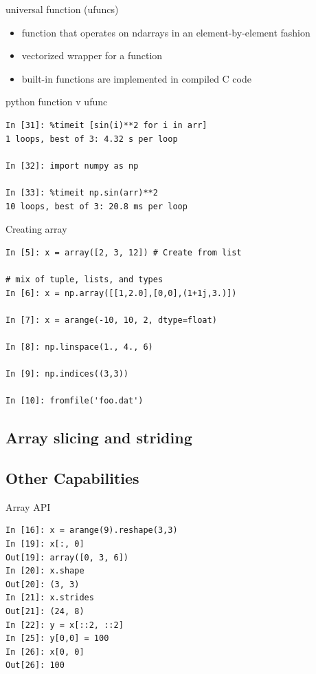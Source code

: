 \begin{frame}[fragile]
  universal function (ufuncs)
  \begin{itemize}
  \item function that operates on ndarrays in an element-by-element fashion
  \item vectorized wrapper for a function
  \item built-in functions are implemented in compiled C code
  \end{itemize}
  \begin{block}{python function v ufunc}
    \begin{verbatim}
In [31]: %timeit [sin(i)**2 for i in arr]
1 loops, best of 3: 4.32 s per loop

In [32]: import numpy as np

In [33]: %timeit np.sin(arr)**2
10 loops, best of 3: 20.8 ms per loop
    \end{verbatim}
  \end{block}
\end{frame}

\begin{frame}[fragile]
\begin{block}{Creating array}
\begin{verbatim}
In [5]: x = array([2, 3, 12]) # Create from list

# mix of tuple, lists, and types
In [6]: x = np.array([[1,2.0],[0,0],(1+1j,3.)])

In [7]: x = arange(-10, 10, 2, dtype=float)

In [8]: np.linspace(1., 4., 6)

In [9]: np.indices((3,3))

In [10]: fromfile('foo.dat')
\end{verbatim}
\end{block}
\end{frame}

\subsection{Array slicing and striding}
\subsection{Other Capabilities}

\begin{frame}[fragile]
\begin{block}{Array API}
\begin{verbatim}
In [16]: x = arange(9).reshape(3,3)
In [19]: x[:, 0]
Out[19]: array([0, 3, 6])
In [20]: x.shape
Out[20]: (3, 3)
In [21]: x.strides
Out[21]: (24, 8)
In [22]: y = x[::2, ::2]
In [25]: y[0,0] = 100
In [26]: x[0, 0]
Out[26]: 100
\end{verbatim}
\end{block}
\end{frame}

